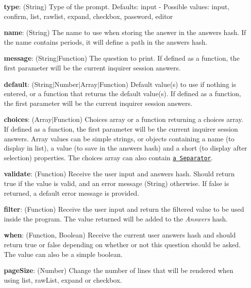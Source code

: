 \begin{DoxyItemize}
\item {\bfseries type}\+: (String) Type of the prompt. Defaults\+: {\ttfamily input} -\/ Possible values\+: {\ttfamily input}, {\ttfamily confirm}, {\ttfamily list}, {\ttfamily rawlist}, {\ttfamily expand}, {\ttfamily checkbox}, {\ttfamily password}, {\ttfamily editor}
\item {\bfseries name}\+: (String) The name to use when storing the answer in the answers hash. If the name contains periods, it will define a path in the answers hash.
\item {\bfseries message}\+: (String$\vert$\+Function) The question to print. If defined as a function, the first parameter will be the current inquirer session answers.
\item {\bfseries default}\+: (String$\vert$\+Number$\vert$\+Array$\vert$\+Function) Default value(s) to use if nothing is entered, or a function that returns the default value(s). If defined as a function, the first parameter will be the current inquirer session answers.
\item {\bfseries choices}\+: (Array$\vert$\+Function) Choices array or a function returning a choices array. If defined as a function, the first parameter will be the current inquirer session answers. Array values can be simple {\ttfamily strings}, or {\ttfamily objects} containing a {\ttfamily name} (to display in list), a {\ttfamily value} (to save in the answers hash) and a {\ttfamily short} (to display after selection) properties. The choices array can also contain \href{#separator}{\tt a {\ttfamily Separator}}.
\item {\bfseries validate}\+: (Function) Receive the user input and answers hash. Should return {\ttfamily true} if the value is valid, and an error message ({\ttfamily String}) otherwise. If {\ttfamily false} is returned, a default error message is provided.
\item {\bfseries filter}\+: (Function) Receive the user input and return the filtered value to be used inside the program. The value returned will be added to the {\itshape Answers} hash.
\item {\bfseries when}\+: (Function, Boolean) Receive the current user answers hash and should return {\ttfamily true} or {\ttfamily false} depending on whether or not this question should be asked. The value can also be a simple boolean.
\item {\bfseries page\+Size}\+: (Number) Change the number of lines that will be rendered when using {\ttfamily list}, {\ttfamily raw\+List}, {\ttfamily expand} or {\ttfamily checkbox}.
\end{DoxyItemize}

